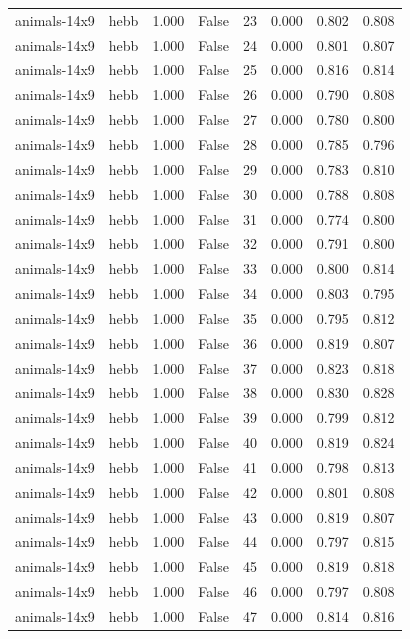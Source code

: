 \begin{tabular}{llrrrrrr}
animals-14x9 & hebb & 1.000 & False & 23 & 0.000 & 0.802 & 0.808 \\
animals-14x9 & hebb & 1.000 & False & 24 & 0.000 & 0.801 & 0.807 \\
animals-14x9 & hebb & 1.000 & False & 25 & 0.000 & 0.816 & 0.814 \\
animals-14x9 & hebb & 1.000 & False & 26 & 0.000 & 0.790 & 0.808 \\
animals-14x9 & hebb & 1.000 & False & 27 & 0.000 & 0.780 & 0.800 \\
animals-14x9 & hebb & 1.000 & False & 28 & 0.000 & 0.785 & 0.796 \\
animals-14x9 & hebb & 1.000 & False & 29 & 0.000 & 0.783 & 0.810 \\
animals-14x9 & hebb & 1.000 & False & 30 & 0.000 & 0.788 & 0.808 \\
animals-14x9 & hebb & 1.000 & False & 31 & 0.000 & 0.774 & 0.800 \\
animals-14x9 & hebb & 1.000 & False & 32 & 0.000 & 0.791 & 0.800 \\
animals-14x9 & hebb & 1.000 & False & 33 & 0.000 & 0.800 & 0.814 \\
animals-14x9 & hebb & 1.000 & False & 34 & 0.000 & 0.803 & 0.795 \\
animals-14x9 & hebb & 1.000 & False & 35 & 0.000 & 0.795 & 0.812 \\
animals-14x9 & hebb & 1.000 & False & 36 & 0.000 & 0.819 & 0.807 \\
animals-14x9 & hebb & 1.000 & False & 37 & 0.000 & 0.823 & 0.818 \\
animals-14x9 & hebb & 1.000 & False & 38 & 0.000 & 0.830 & 0.828 \\
animals-14x9 & hebb & 1.000 & False & 39 & 0.000 & 0.799 & 0.812 \\
animals-14x9 & hebb & 1.000 & False & 40 & 0.000 & 0.819 & 0.824 \\
animals-14x9 & hebb & 1.000 & False & 41 & 0.000 & 0.798 & 0.813 \\
animals-14x9 & hebb & 1.000 & False & 42 & 0.000 & 0.801 & 0.808 \\
animals-14x9 & hebb & 1.000 & False & 43 & 0.000 & 0.819 & 0.807 \\
animals-14x9 & hebb & 1.000 & False & 44 & 0.000 & 0.797 & 0.815 \\
animals-14x9 & hebb & 1.000 & False & 45 & 0.000 & 0.819 & 0.818 \\
animals-14x9 & hebb & 1.000 & False & 46 & 0.000 & 0.797 & 0.808 \\
animals-14x9 & hebb & 1.000 & False & 47 & 0.000 & 0.814 & 0.816 \\

\end{tabular}
